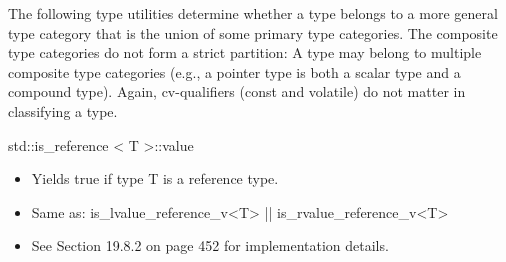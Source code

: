 
The following type utilities determine whether a type belongs to a more general type category that is the union of some primary type categories. The composite type categories do not form a strict partition: A type may belong to multiple composite type categories (e.g., a pointer type is both a scalar type and a compound type). Again, cv-qualifiers (const and volatile) do not matter in classifying a type.

std::is\_reference < T >::value

\begin{itemize}
\item 
Yields true if type T is a reference type.

\item 
Same as: is\_lvalue\_reference\_v<T> || is\_rvalue\_reference\_v<T>

\item 
See Section 19.8.2 on page 452 for implementation details.
\end{itemize}

